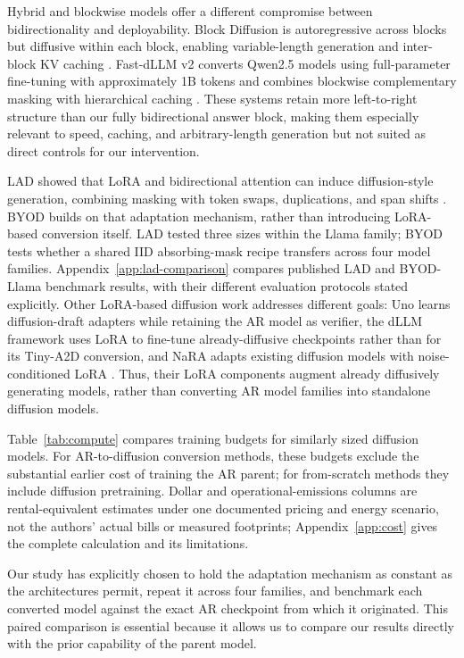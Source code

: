 \documentclass{article}
\newcommand{\method}{BYOD}
\begin{document}
Hybrid and blockwise models offer a different compromise between bidirectionality and deployability. Block Diffusion is autoregressive across blocks but diffusive within each block, enabling variable-length generation and inter-block KV caching \citep{arriola2025block}. Fast-dLLM v2 converts Qwen2.5 models using full-parameter fine-tuning with approximately 1B tokens and combines blockwise complementary masking with hierarchical caching \citep{wu2025fastdllmv2}. These systems retain more left-to-right structure than our fully bidirectional answer block, making them especially relevant to speed, caching, and arbitrary-length generation but not suited as direct controls for our intervention.

LAD showed that LoRA and bidirectional attention can induce diffusion-style generation, combining masking with token swaps, duplications, and span shifts \citep{kuiper2025lad,hu2022lora}. \method{} builds on that adaptation mechanism, rather than introducing LoRA-based conversion itself. LAD tested three sizes within the Llama family; \method{} tests whether a shared IID absorbing-mask recipe transfers across four model families. Appendix~\ref{app:lad-comparison} compares published LAD and BYOD-Llama benchmark results, with their different evaluation protocols stated explicitly. Other LoRA-based diffusion work addresses different goals: Uno learns diffusion-draft adapters while retaining the AR model as verifier, the dLLM framework uses LoRA to fine-tune already-diffusive checkpoints rather than for its Tiny-A2D conversion, and NaRA adapts existing diffusion models with noise-conditioned LoRA \citep{sahoo2026uno,zhou2026dllm,wang2026nara}. Thus, their LoRA components augment already diffusively generating models, rather than converting AR model families into standalone diffusion models.

Table~\ref{tab:compute} compares training budgets for similarly sized diffusion models. For AR-to-diffusion conversion methods, these budgets exclude the substantial earlier cost of training the AR parent; for from-scratch methods they include diffusion pretraining. Dollar and operational-emissions columns are rental-equivalent estimates under one documented pricing and energy scenario, not the authors' actual bills or measured footprints; Appendix~\ref{app:cost} gives the complete calculation and its limitations.

Our study has explicitly chosen to hold the adaptation mechanism as constant as the architectures permit, repeat it across four families, and benchmark each converted model against the exact AR checkpoint from which it originated. This paired comparison is essential because it allows us to compare our results directly with the prior capability of the parent model.
\end{document}

